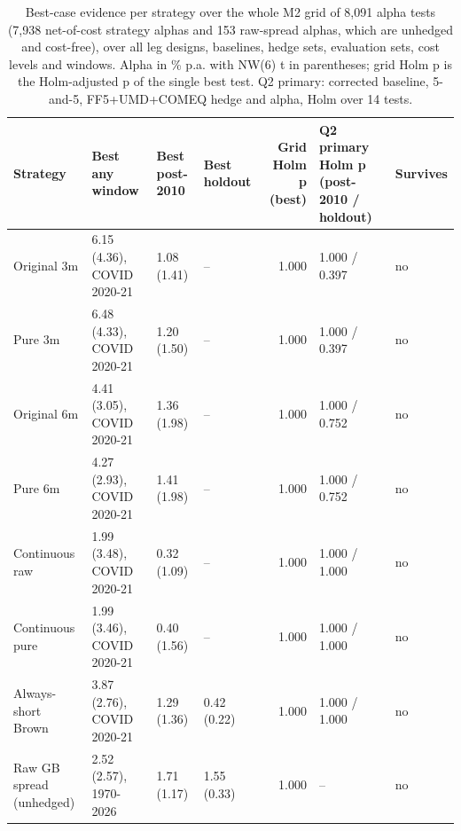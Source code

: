 \begin{table}
\caption{Best-case evidence per strategy over the whole M2 grid of 8,091 alpha tests (7,938 net-of-cost strategy alphas and 153 raw-spread alphas, which are unhedged and cost-free), over all leg designs, baselines, hedge sets, evaluation sets, cost levels and windows. Alpha in \% p.a. with NW(6) t in parentheses; grid Holm p is the Holm-adjusted p of the single best test. Q2 primary: corrected baseline, 5-and-5, FF5+UMD+COMEQ hedge and alpha, Holm over 14 tests.}
\label{tab:m2_summary}
\begin{tabular}{llllrll}
\toprule
Strategy & Best any window & Best post-2010 & Best holdout & Grid Holm p (best) & Q2 primary Holm p (post-2010 / holdout) & Survives \\
\midrule
Original 3m & 6.15 (4.36), COVID 2020-21 & 1.08 (1.41) & -- & 1.000 & 1.000 / 0.397 & no \\
Pure 3m & 6.48 (4.33), COVID 2020-21 & 1.20 (1.50) & -- & 1.000 & 1.000 / 0.397 & no \\
Original 6m & 4.41 (3.05), COVID 2020-21 & 1.36 (1.98) & -- & 1.000 & 1.000 / 0.752 & no \\
Pure 6m & 4.27 (2.93), COVID 2020-21 & 1.41 (1.98) & -- & 1.000 & 1.000 / 0.752 & no \\
Continuous raw & 1.99 (3.48), COVID 2020-21 & 0.32 (1.09) & -- & 1.000 & 1.000 / 1.000 & no \\
Continuous pure & 1.99 (3.46), COVID 2020-21 & 0.40 (1.56) & -- & 1.000 & 1.000 / 1.000 & no \\
Always-short Brown & 3.87 (2.76), COVID 2020-21 & 1.29 (1.36) & 0.42 (0.22) & 1.000 & 1.000 / 1.000 & no \\
Raw GB spread (unhedged) & 2.52 (2.57), 1970-2026 & 1.71 (1.17) & 1.55 (0.33) & 1.000 & -- & no \\
\bottomrule
\end{tabular}
\end{table}
